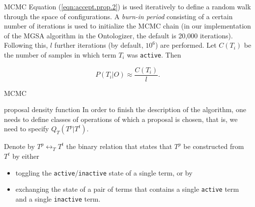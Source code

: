 \documentclass{beamer}
\begin{document}
\begin{frame}{MCMC}
 Equation (\ref{eqn:accept.prop.2}) is used iteratively to define a
random walk through the space of configurations.  A \emph{burn-in
  period} consisting of a certain number of iterations is used to
initialize the MCMC chain (in our implementation of the MGSA algorithm
in the Ontologizer, the default is 20,000
iterations). Following this, $l$ further iterations (by default,
$10^6$) are performed.  Let $C(T_i)$ be the number of samples in which
term $T_i$ was \texttt{active}. Then

\begin{equation}
P(T_i|O)\approx \frac{C(T_i)}{l}.
\label{eqn:mgsa-marginal}
\end{equation}
 
 
\end{frame}
\begin{frame}{MCMC}
\begin{mybluebox}{proposal density function}
 In order to finish the description of the algorithm, one needs to define
classes of operations of which a proposal is chosen, that is, we need to
specify $Q_T(T^p|T^t)$.
\end{mybluebox}


  Denote by $T^p \leftrightarrow_T T^t$ the binary
relation that  states  that $T^p$   be constructed from $T^t$ by either
\begin{itemize}
  \item toggling the \texttt{active}/\texttt{inactive} state of a single term, or by
  \item exchanging the state of a pair of terms that contains a single
    \texttt{active} term and a single \texttt{inactive} term.
\end{itemize}
\end{frame}
\end{document}
